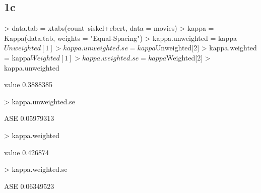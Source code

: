 \documentclass{article}
\begin{document}
\subsection{1c}
\begin{Schunk}
\begin{Sinput}
> data.tab = xtabs(count~siskel+ebert, data = movies)
> kappa = Kappa(data.tab, weights = "Equal-Spacing")
> kappa.unweighted = kappa$Unweighted[1]
> kappa.unweighted.se = kappa$Unweighted[2]
> kappa.weighted = kappa$Weighted[1]
> kappa.weighted.se = kappa$Weighted[2]
> kappa.unweighted 
\end{Sinput}
\begin{Soutput}
    value 
0.3888385 
\end{Soutput}
\begin{Sinput}
> kappa.unweighted.se
\end{Sinput}
\begin{Soutput}
       ASE 
0.05979313 
\end{Soutput}
\begin{Sinput}
> kappa.weighted
\end{Sinput}
\begin{Soutput}
   value 
0.426874 
\end{Soutput}
\begin{Sinput}
> kappa.weighted.se
\end{Sinput}
\begin{Soutput}
       ASE 
0.06349523 
\end{Soutput}
\end{Schunk}
\end{document}
